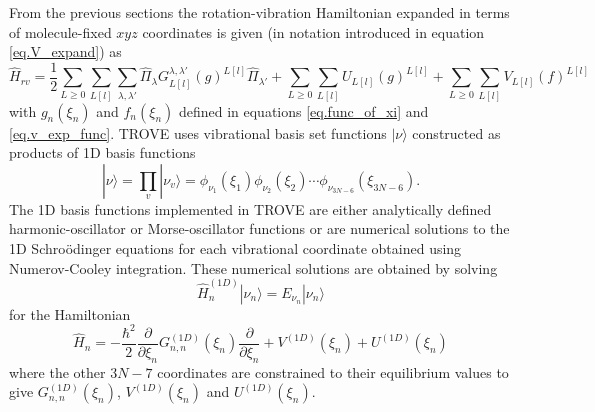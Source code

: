 From the previous sections the rotation-vibration Hamiltonian expanded in terms of molecule-fixed $xyz$ coordinates is given
(in notation introduced in equation \ref{eq.V_expand}) as
\begin{equation}
\label{eq.rovibH}
\hat{H}_{rv} = \frac{1}{2} \sum_{L \geq 0} \sum_{L[l]} \sum_{\lambda,\lambda'} \hat{\Pi}_{\lambda} G_{L[l]}^{\lambda,\lambda'}
(g)^{L[l]} \hat{\Pi}_{\lambda'} + \sum_{L \geq 0} \sum_{L[l]} U_{L[l]}(g)^{L[l]} 
+ \sum_{L \geq 0} \sum_{L[l]} V_{L[l]} (f)^{L[l]}
\end{equation}
with $g_n(\xi_n)$ and $f_n(\xi_n)$ defined in equations \ref{eq.func_of_xi} and \ref{eq.v_exp_func}. TROVE uses 
vibrational basis set functions $|\nu \rangle$ constructed as products of 1D basis functions
\begin{equation}
\label{eq.vib_basis_prod}
|\nu \rangle = \prod_{v} | \nu_v \rangle = \phi_{\nu_1}(\xi_1)\phi_{\nu_2}(\xi_2)\cdots \phi_{\nu_{3N-6}}(\xi_{3N-6}).
\end{equation}
The 1D basis functions implemented in TROVE are either analytically defined harmonic-oscillator or Morse-oscillator 
functions or are numerical solutions to the 1D Schro\"{o}dinger equations for each vibrational coordinate obtained
using  Numerov-Cooley integration. These numerical solutions are obtained by solving
\begin{equation}
\label{eq.1Dschrodinger}
\hat{H}_n^{(1D)} | \nu_n \rangle = E_{\nu_n} | \nu_n \rangle
\end{equation}
for the Hamiltonian
\begin{equation}
\label{eq.1D_Ham}
\hat{H}_n = -\frac{\hbar^2}{2} \frac{\partial}{\partial \xi_n} G_{n,n}^{(1D)}(\xi_n) \frac{\partial}{\partial \xi_n}
+ V^{(1D)}(\xi_n) + U^{(1D)}(\xi_n)
\end{equation}
where the other $3N-7$ coordinates are constrained to their equilibrium values to give $G_{n,n}^{(1D)}(\xi_n)$, 
 $V^{(1D)}(\xi_n)$ and $U^{(1D)}(\xi_n)$. 
 
